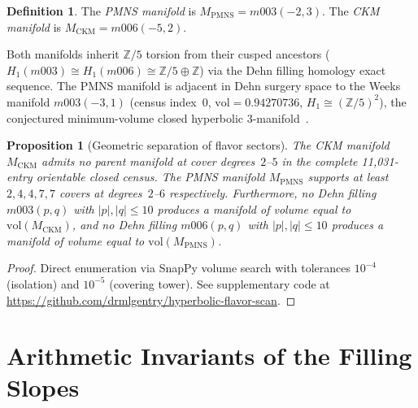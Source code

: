 \documentclass[12pt]{article}
\newtheorem{proposition}[theorem]{Proposition}
\theoremstyle{definition}
\newtheorem{definition}[theorem]{Definition}
\begin{document}
\begin{definition}
The \emph{PMNS manifold} is $M_{\mathrm{PMNS}} = m003(-2,3)$.
The \emph{CKM manifold} is $M_{\mathrm{CKM}} = m006(-5,2)$.
\end{definition}

Both manifolds inherit $\mathbb{Z}/5$ torsion from their cusped ancestors
($H_1(m003) \cong H_1(m006) \cong \mathbb{Z}/5 \oplus \mathbb{Z}$) via
the Dehn filling homology exact sequence. The PMNS manifold is adjacent
in Dehn surgery space to the Weeks manifold $m003(-3,1)$
(census index~0, $\mathrm{vol} = 0.94270736$,
$H_1 \cong (\mathbb{Z}/5)^2$), the conjectured minimum-volume closed
hyperbolic 3-manifold~\cite{Weeks}.

\begin{proposition}[Geometric separation of flavor sectors]
\label{prop:separation}
The CKM manifold $M_{\mathrm{CKM}}$ admits no parent manifold at cover
degrees~$2$--$5$ in the complete 11{,}031-entry orientable closed census.
The PMNS manifold $M_{\mathrm{PMNS}}$ supports at least $2, 4, 4, 7, 7$
covers at degrees~$2$--$6$ respectively.
Furthermore, no Dehn filling $m003(p,q)$ with $|p|,|q|\leq 10$ produces
a manifold of volume equal to $\mathrm{vol}(M_{\mathrm{CKM}})$, and no
Dehn filling $m006(p,q)$ with $|p|,|q|\leq 10$ produces a manifold of
volume equal to $\mathrm{vol}(M_{\mathrm{PMNS}})$.
\end{proposition}

\begin{proof}
Direct enumeration via SnapPy volume search with tolerances $10^{-4}$
(isolation) and $10^{-5}$ (covering tower). See supplementary code at
\url{https://github.com/drmlgentry/hyperbolic-flavor-scan}.
\end{proof}

\section{Arithmetic Invariants of the Filling Slopes}
\label{sec:arithmetic}
\end{document}
